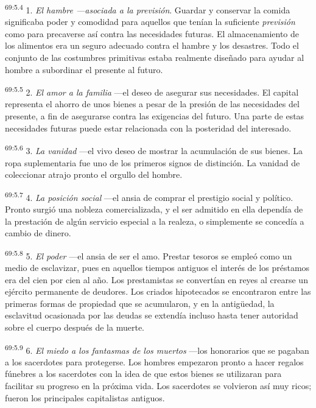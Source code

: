 \documentclass[twoside, 11pt]{book}
\begin{document}
\par
\textsuperscript{69:5.4} 1. \textit{El hambre ---asociada a la previsión}. Guardar y conservar la comida significaba poder y comodidad para aquellos que tenían la suficiente \textit{previsión} como para precaverse así contra las necesidades futuras. El almacenamiento de los alimentos era un seguro adecuado contra el hambre y los desastres. Todo el conjunto de las costumbres primitivas estaba realmente diseñado para ayudar al hombre a subordinar el presente al futuro.

\par
\textsuperscript{69:5.5} 2. \textit{El amor a la familia} ---el deseo de asegurar sus necesidades. El capital representa el ahorro de unos bienes a pesar de la presión de las necesidades del presente, a fin de asegurarse contra las exigencias del futuro. Una parte de estas necesidades futuras puede estar relacionada con la posteridad del interesado.

\par
\textsuperscript{69:5.6} 3. \textit{La vanidad} ---el vivo deseo de mostrar la acumulación de sus bienes. La ropa suplementaria fue uno de los primeros signos de distinción. La vanidad de coleccionar atrajo pronto el orgullo del hombre.

\par
\textsuperscript{69:5.7} 4. \textit{La posición social} ---el ansia de comprar el prestigio social y político. Pronto surgió una nobleza comercializada, y el ser admitido en ella dependía de la prestación de algún servicio especial a la realeza, o simplemente se concedía a cambio de dinero.

\par
\textsuperscript{69:5.8} 5. \textit{El poder} ---el ansia de ser el amo. Prestar tesoros se empleó como un medio de esclavizar, pues en aquellos tiempos antiguos el interés de los préstamos era del cien por cien al año. Los prestamistas se convertían en reyes al crearse un ejército permanente de deudores. Los criados hipotecados se encontraron entre las primeras formas de propiedad que se acumularon, y en la antig\"uedad, la esclavitud ocasionada por las deudas se extendía incluso hasta tener autoridad sobre el cuerpo después de la muerte.

\par
\textsuperscript{69:5.9} 6. \textit{El miedo a los fantasmas de los muertos} ---los honorarios que se pagaban a los sacerdotes para protegerse. Los hombres empezaron pronto a hacer regalos fúnebres a los sacerdotes con la idea de que estos bienes se utilizaran para facilitar su progreso en la próxima vida. Los sacerdotes se volvieron así muy ricos; fueron los principales capitalistas antiguos.
\end{document}
